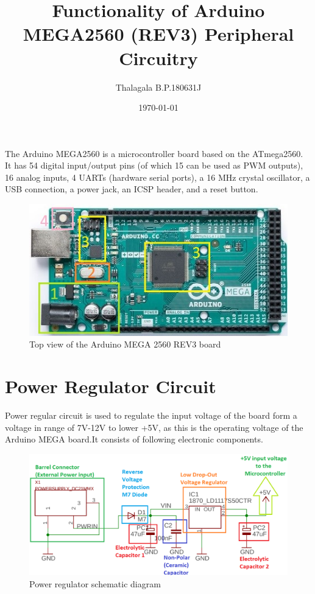 \documentclass[a4paper,11pt,twocolumn]{article}
\title{\Large\textbf{Functionality of Arduino MEGA2560 (REV3) Peripheral Circuitry}}
\author{Thalagala B.P.\hspace{1cm}180631J}
\date{\today}
\begin{document}
\maketitle	

The Arduino MEGA2560 is a microcontroller board based on the ATmega2560. It has 54 digital input/output pins (of which 15 can be used as PWM outputs), 16 analog inputs, 4 UARTs (hardware serial ports), a 16 MHz crystal oscillator, a USB connection, a power jack, an ICSP header, and a reset button\cite{arduino}.

\begin{center}
	\begin{figure}[!h]
		\centering
		\includegraphics[scale=0.6]{figures/top}
		
			\caption{Top view of the Arduino MEGA 2560 REV3 board\cite{arduino}}
	
	\end{figure}
\end{center}



\section{Power Regulator Circuit}

Power regular circuit is used to regulate the input voltage of the board form a voltage in range of 7V-12V to lower +5V, as this is the operating voltage of the Arduino MEGA board.It consists of following electronic components.

\begin{center}
	\begin{figure}[!h]
		\centering
		\includegraphics[scale=0.3]{figures/vreg}
		\caption{Power regulator schematic diagram\cite{arduino}}
	\end{figure}
\end{center}
\end{document}
